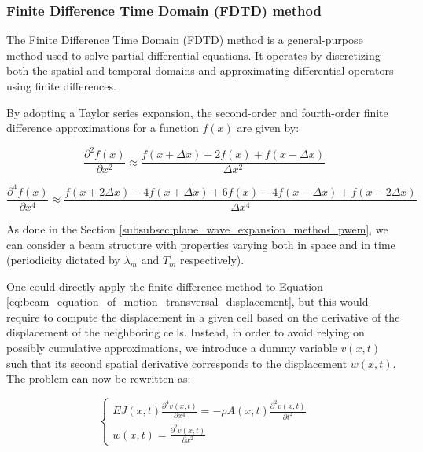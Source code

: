 \subsubsection{Finite Difference Time Domain (FDTD) method}
\label{subsubsec:finite_difference_time_domain_fdtd_method}

The Finite Difference Time Domain (FDTD) method is a general-purpose method used to solve partial differential equations.
It operates by discretizing both the spatial and temporal domains and approximating differential operators using finite differences.

By adopting a Taylor series expansion, the second-order and fourth-order finite difference approximations for a function $f(x)$ are given by:

\begin{equation}
    \frac{\partial^2 f(x)}{\partial x^2} \approx \frac{f(x + \Delta x) - 2 f(x) + f(x - \Delta x)}{\Delta x^2}
    \label{eq:finite_difference_second_order}
\end{equation}

\begin{equation}
    \frac{\partial^4 f(x)}{\partial x^4} \approx \frac{f(x + 2 \Delta x) - 4 f(x + \Delta x) + 6 f(x) - 4 f(x - \Delta x) + f(x - 2 \Delta x)}{\Delta x^4}
    \label{eq:finite_difference_fourth_order}
\end{equation}

As done in the Section \ref{subsubsec:plane_wave_expansion_method_pwem}, we can consider a beam structure with properties varying both in space and in time (periodicity dictated by $\lambda_m$ and $T_m$ respectively).

One could directly apply the finite difference method to Equation \ref{eq:beam_equation_of_motion_transversal_displacement}, but this would require to compute the displacement in a given cell based on the derivative of the displacement of the neighboring cells.
Instead, in order to avoid relying on possibly cumulative approximations, we introduce a dummy variable $v(x,t)$ such that its second spatial derivative corresponds to the displacement $w(x,t)$.
The problem can now be rewritten as:

\begin{equation}
    \begin{cases}
        EJ(x, t) \frac{\partial^4 v(x,t)}{\partial x^4} = - \rho A(x, t) \frac{\partial^2 v(x,t)}{\partial t^2} \\
        w(x,t) = \frac{\partial^2 v(x,t)}{\partial x^2}
    \end{cases}
\end{equation}

